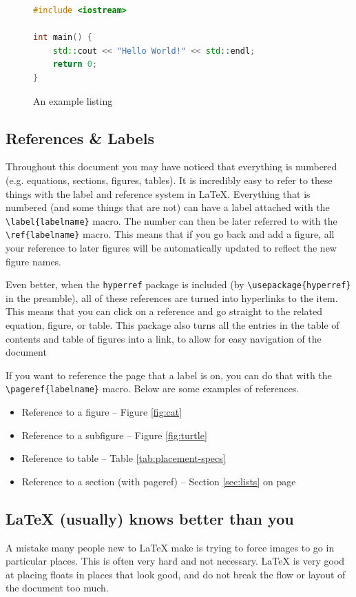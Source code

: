 \documentclass[11pt, twoside]{article}
\begin{document}
\begin{figure}[H]
    \caption{An example listing}
    \begin{lstlisting}[language=c++,keywordstyle=\color{blue}]
#include <iostream>

int main() {
    std::cout << "Hello World!" << std::endl;
    return 0;
}\end{lstlisting}
\end{figure}

\subsection{References \& Labels}
Throughout this document you may have noticed that everything is numbered (e.g. equations, sections, figures, tables). It is incredibly easy to refer to these things with the label and reference system in \LaTeX{}. Everything that is numbered (and some things that are not) can have a label attached with the \lstinline|\label{labelname}| macro. The number can then be later referred to with the \lstinline|\ref{labelname}| macro. This means that if you go back and add a figure, all your reference to later figures will be automatically updated to reflect the new figure names.

Even better, when the \lstinline{hyperref} package is included (by \lstinline|\usepackage{hyperref}| in the preamble), all of these references are turned into hyperlinks to the item. This means that you can click on a reference and go straight to the related equation, figure, or table. This package also turns all the entries in the table of contents and table of figures into a link, to allow for easy navigation of the document

If you want to reference the page that a label is on, you can do that with the \lstinline|\pageref{labelname}| macro.
Below are some examples of references.
\begin{itemize}
    \item Reference to a figure -- Figure \ref{fig:cat}
    \item Reference to a subfigure -- Figure \ref{fig:turtle}
    \item Reference to table -- Table \ref{tab:placement-specs}
    \item Reference to a section (with pageref) -- Section \ref{sec:lists} on page \pageref{sec:lists}
\end{itemize}

\subsection{\LaTeX{} (usually) knows better than you}
A mistake many people new to \LaTeX{} make is trying to force images to go in particular places. This is often very hard and not necessary. \LaTeX{} is very good at placing floats in places that look good, and do not break the flow or layout of the document too much.
\end{document}
